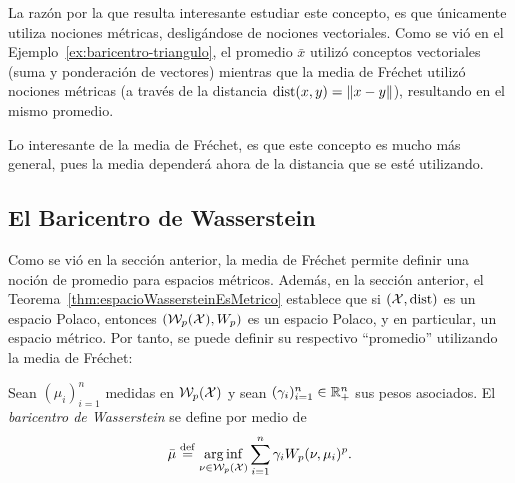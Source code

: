 {{{			\begin{remark}
				La razón por la que resulta interesante estudiar este concepto, es que únicamente utiliza nociones métricas, desligándose de nociones vectoriales. Como se vió en el Ejemplo~\ref{ex:baricentro-triangulo}, el promedio $\bar x$ utilizó conceptos vectoriales (suma y ponderación de vectores) mientras que la media de Fréchet utilizó nociones métricas (a través de la distancia $\dist(x, y) = \|x - y\|$), resultando en el mismo promedio.

				Lo interesante de la media de Fréchet, es que este concepto es mucho más general, pues la media dependerá ahora de la distancia que se esté utilizando.

			\end{remark}

		}  %

		\subsection*{El Baricentro de Wasserstein}\label{ssec:el-baricentro-de-Wasserstein}
		{
			Como se vió en la sección anterior, la media de Fréchet permite definir una noción de promedio para espacios métricos. Además, en la sección anterior, el Teorema~\ref{thm:espacioWassersteinEsMetrico} establece que si $(\cX, \dist)$ es un espacio Polaco, entonces $(\WassersteinSpace[p]{\cX}, W_p)$ es un espacio Polaco, y en particular, un espacio métrico. Por tanto, se puede definir su respectivo ``promedio'' utilizando la media de Fréchet:

			\begin{definition}
				Sean $(\mu_{i})_{i=1}^{n}$ medidas en $\WassersteinSpace[p]{\cX} $ y sean $(\gamma_{i})_{i=1}^{n} \in \R_+^n$ sus pesos asociados. El \emph{baricentro de Wasserstein} se define por medio de
				\begin{equation}
					\bar \mu \eqdef \arginf_{\nu \in \WassersteinSpace[p]{\cX} } \sum_{i=1}^{n} \gamma_i \Wasserstein[p]{\nu}{\mu_i}^p.
				\end{equation}

			\end{definition}

}}}

